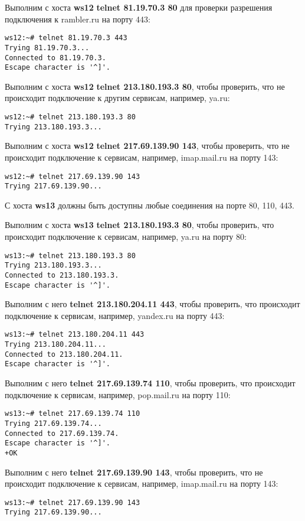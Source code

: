 \documentclass[a4paper,12pt]{article}
\begin{document}
Выполним с хоста \textbf{ws12} \textbf{telnet 81.19.70.3 80} для проверки разрешения
подключения к rambler.ru на порту 443:
\begin{Verbatim}
ws12:~# telnet 81.19.70.3 443
Trying 81.19.70.3...
Connected to 81.19.70.3.
Escape character is '^]'.
\end{Verbatim}

Выполним с хоста \textbf{ws12} \textbf{telnet 213.180.193.3 80},  чтобы проверить, что
не происходит подключение к другим сервисам, например, ya.ru:
\begin{Verbatim}
ws12:~# telnet 213.180.193.3 80
Trying 213.180.193.3...
\end{Verbatim}

Выполним с хоста \textbf{ws12} \textbf{telnet 217.69.139.90 143},  чтобы проверить,
что не происходит подключение к сервисам, например, imap.mail.ru на порту 143:
\begin{Verbatim}
ws12:~# telnet 217.69.139.90 143
Trying 217.69.139.90...
\end{Verbatim}

С хоста \textbf{ws13} должны быть доступны любые соединения на порте 80, 110, 443.

Выполним с хоста \textbf{ws13} \textbf{telnet 213.180.193.3 80},  чтобы проверить, что
происходит подключение к сервисам, например, ya.ru на порту 80:
\begin{Verbatim}
ws13:~# telnet 213.180.193.3 80
Trying 213.180.193.3...
Connected to 213.180.193.3.
Escape character is '^]'.
\end{Verbatim}

Выполним с него \textbf{telnet 213.180.204.11 443},  чтобы проверить, что
происходит подключение к сервисам, например, yandex.ru на порту 443:
\begin{Verbatim}
ws13:~# telnet 213.180.204.11 443
Trying 213.180.204.11...
Connected to 213.180.204.11.
Escape character is '^]'.
\end{Verbatim}

Выполним с него \textbf{telnet 217.69.139.74 110},  чтобы проверить, что
происходит подключение к сервисам, например, pop.mail.ru на порту 110:
\begin{Verbatim}
ws13:~# telnet 217.69.139.74 110
Trying 217.69.139.74...
Connected to 217.69.139.74.
Escape character is '^]'.
+OK
\end{Verbatim}

Выполним с него \textbf{telnet 217.69.139.90 143},  чтобы проверить, что не
происходит подключение к сервисам, например, imap.mail.ru на порту 143:
\begin{Verbatim}
ws13:~# telnet 217.69.139.90 143
Trying 217.69.139.90...
\end{Verbatim}
\end{document}
